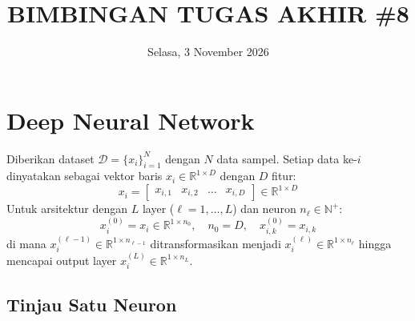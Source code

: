 \documentclass[11pt,a4paper]{article}
\title{
    \vspace{-1.6cm}
    \textbf{\Large BIMBINGAN TUGAS AKHIR \#8} \\[0.2em]
}
\author{}
\date{\vspace{-0.6cm} Selasa, 3 November 2026}
\def\mathbf#1{#1}%
\theoremstyle{plain}
\theoremstyle{definition}
\theoremstyle{remark}
\begin{document}
\maketitle
\vspace{-1.1cm}
\setlength{\abovedisplayskip}{3pt}
\setlength{\belowdisplayskip}{3pt}
\setlength{\abovedisplayshortskip}{1pt}
\setlength{\belowdisplayshortskip}{1pt}

\section{Deep Neural Network}
\label{sec:dnn}

\noindent Diberikan dataset $\mathcal{D} = \{\mathbf{x}_i\}_{i=1}^N$ dengan $N$ data sampel. Setiap data ke-$i$ dinyatakan sebagai vektor baris $\mathbf{x}_i \in \mathbb{R}^{1 \times D}$ dengan $D$ fitur:
\begin{equation}
    \mathbf{x}_i = \begin{bmatrix} x_{i, 1} & x_{i, 2} & \dots & x_{i, D} \end{bmatrix} \in \mathbb{R}^{1 \times D} \label{eq:vektor_fitur_data_i}
\end{equation}
Untuk arsitektur dengan $L$ layer ($\ell = 1, \dots, L$) dan neuron $n_\ell \in \mathbb{N}^+$:
\begin{equation}
    \mathbf{x}^{(0)}_i = \mathbf{x}_i \in \mathbb{R}^{1 \times n_0}, \quad n_0 = D, \quad x^{(0)}_{i, k} = x_{i, k}
\end{equation}
di mana $\mathbf{x}^{(\ell-1)}_i \in \mathbb{R}^{1 \times n_{\ell-1}}$ ditransformasikan menjadi $\mathbf{x}^{(\ell)}_i \in \mathbb{R}^{1 \times n_\ell}$ hingga mencapai output layer $\mathbf{x}^{(L)}_i \in \mathbb{R}^{1 \times n_L}$.

\subsection{Tinjau Satu Neuron}
\label{subsec:neuron_skalar}
\end{document}
